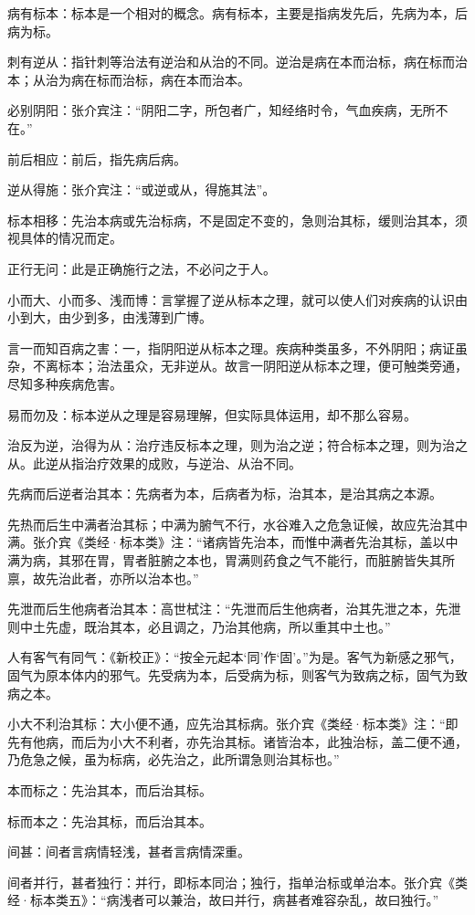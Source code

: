 \documentclass[draft,12pt]{ctexbook}
\begin{document}
\begin{jiaozhu}
	\item 病有标本：标本是一个相对的概念。病有标本，主要是指病发先后，先病为本，后病为标。
	\item 刺有逆从：指针刺等治法有逆治和从治的不同。逆治是病在本而治标，病在标而治本；从治为病在标而治标，病在本而治本。
	\item 必别阴阳：张介宾注：“阴阳二字，所包者广，知经络时令，气血疾病，无所不在。”
	\item 前后相应：前后，指先病后病。
	\item 逆从得施：张介宾注：“或逆或从，得施其法”。
	\item 标本相移：先治本病或先治标病，不是固定不变的，急则治其标，缓则治其本，须视具体的情况而定。
	\item 正行无问：此是正确施行之法，不必问之于人。
	\item 小而大、小而多、浅而博：言掌握了逆从标本之理，就可以使人们对疾病的认识由小到大，由少到多，由浅薄到广博。
	\item 言一而知百病之害：一，指阴阳逆从标本之理。疾病种类虽多，不外阴阳；病证虽杂，不离标本；治法虽众，无非逆从。故言一阴阳逆从标本之理，便可触类旁通，尽知多种疾病危害。
	\item 易而勿及：标本逆从之理是容易理解，但实际具体运用，却不那么容易。
	\item 治反为逆，治得为从：治疗违反标本之理，则为治之逆；符合标本之理，则为治之从。此逆从指治疗效果的成败，与逆治、从治不同。
	\item 先病而后逆者治其本：先病者为本，后病者为标，治其本，是治其病之本源。
	\item 先热而后生中满者治其标；中满为腑气不行，水谷难入之危急证候，故应先治其中满。张介宾《类经·标本类》注：“诸病皆先治本，而惟中满者先治其标，盖以中满为病，其邪在胃，胃者脏腑之本也，胃满则药食之气不能行，而脏腑皆失其所禀，故先治此者，亦所以治本也。”
	\item 先泄而后生他病者治其本：高世栻注：“先泄而后生他病者，治其先泄之本，先泄则中土先虚，既治其本，必且调之，乃治其他病，所以重其中土也。”
	\item 人有客气有同气：《新校正》：“按全元起本‘同’作‘固’。”为是。客气为新感之邪气，固气为原本体内的邪气。先受病为本，后受病为标，则客气为致病之标，固气为致病之本。
	\item 小大不利治其标：大小便不通，应先治其标病。张介宾《类经·标本类》注：“即先有他病，而后为小大不利者，亦先治其标。诸皆治本，此独治标，盖二便不通，乃危急之候，虽为标病，必先治之，此所谓急则治其标也。”
	\item 本而标之：先治其本，而后治其标。
	\item 标而本之：先治其标，而后治其本。
	\item 间甚：间者言病情轻浅，甚者言病情深重。
	\item 间者并行，甚者独行：并行，即标本同治；独行，指单治标或单治本。张介宾《类经·标本类五》：“病浅者可以兼治，故曰并行，病甚者难容杂乱，故曰独行。”
\end{jiaozhu}
\end{document}
